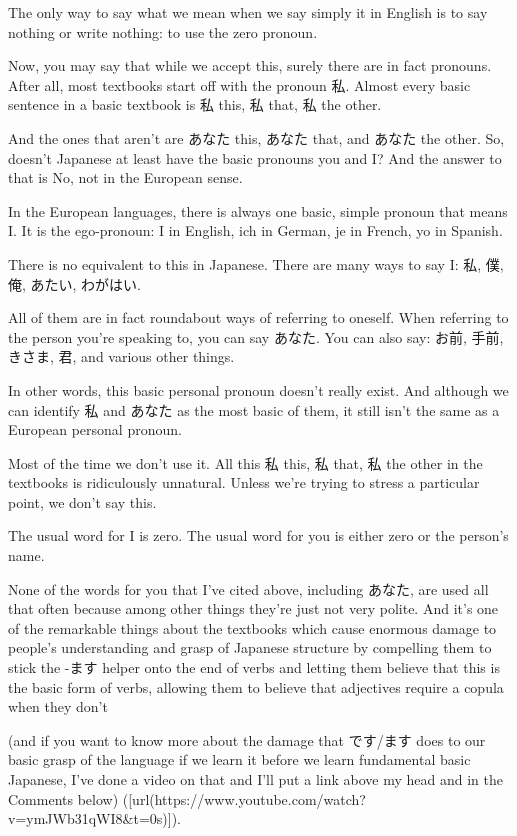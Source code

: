 The only way to say what we mean when we say simply it in English is to say nothing or write nothing: to use the zero pronoun.

Now, you may say that while we accept this, surely there are in fact pronouns. After all, most textbooks start off with the pronoun 私. Almost every basic sentence in a basic textbook is 私 this, 私 that, 私 the other.

And the ones that aren't are あなた this, あなた that, and あなた the other. So, doesn't Japanese at least have the basic pronouns you and I? And the answer to that is No, not in the European sense.

In the European languages, there is always one basic, simple pronoun that means I. It is the ego-pronoun: I in English, ich in German, je in French, yo in Spanish.

There is no equivalent to this in Japanese. There are many ways to say I: 私, 僕, 俺, あたい, わがはい.

All of them are in fact roundabout ways of referring to oneself. When referring to the person you're speaking to, you can say あなた. You can also say: お前, 手前, きさま, 君, and various other things.

In other words, this basic personal pronoun doesn't really exist. And although we can identify 私 and あなた as the most basic of them, it still isn't the same as a European personal pronoun.

{}

Most of the time we don't use it. All this 私 this, 私 that, 私 the other in the textbooks is ridiculously unnatural. Unless we're trying to stress a particular point, we don't say this.

The usual word for I is zero. The usual word for you is either zero or the person's name.

None of the words for you that I've cited above, including あなた, are used all that often because among other things they're just not very polite. And it's one of the remarkable things about the textbooks which cause enormous damage to people's understanding and grasp of Japanese structure by compelling them to stick the -ます helper onto the end of verbs and letting them believe that this is the basic form of verbs, allowing them to believe that adjectives require a copula when they don't

(and if you want to know more about the damage that です/ます does to our basic grasp of the language if we learn it before we learn fundamental basic Japanese, I've done a video on that and I'll put a link above my head and in the Comments below) ([url(https://www.youtube.com/watch?v=ymJWb31qWI8&t=0s)]).

